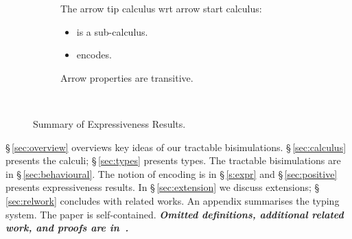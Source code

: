 \begin{figure}[t]
	\centering
	\begin{subfigure}[b]{0.45\linewidth}
		\centering
	\end{subfigure}
	\begin{subfigure}[b]{0.5\linewidth}
		\small
		The arrow tip calculus wrt arrow start calculus:
		\begin{itemize}
			\item	is a sub-calculus.
			\item	encodes.
		\end{itemize}
		Arrow properties are transitive.
	\end{subfigure}
\\
	\caption{Summary of Expressiveness Results. \label{fig:express}}
\Hlinefig
\end{figure}

\smallskip

\S\,\ref{sec:overview} overviews key ideas of our tractable bisimulations.
\noi \S\,\ref{sec:calculus} presents the calculi; 
\S\,\ref{sec:types} presents types.
The tractable bisimulations are in \S\,\ref{sec:behavioural}.
The notion of encoding is in \S\,\ref{s:expr} and
\S\,\ref{sec:positive} %
presents expressiveness results.
In \S\,\ref{sec:extension} we discuss extensions; 
\S\,\ref{sec:relwork} concludes with related works.
An appendix summarises the typing system. 
The paper is self-contained. 
{\bf\em Omitted definitions, additional related work, and  proofs 
are 
in~\cite{KouzapasPY15}.} 

